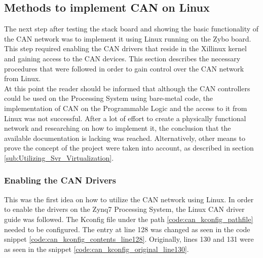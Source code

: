 \subsection{Methods to implement CAN on Linux}\label{sec:methods_to_implement_can}

The next step after testing the stack board and showing the basic functionality of the CAN network was to implement it using Linux running on the Zybo board.
This step required enabling the CAN drivers that reside in the Xillinux kernel and gaining access to the CAN devices.
This section describes the necessary procedures that were followed in order to gain control over the CAN network from Linux.
\\
At this point the reader should be informed that although the CAN controllers could be used on the Processing System using bare-metal code, the implementation of CAN on the Programmable Logic and the access to it from Linux was not successful.
After a lot of effort to create a physically functional network and researching on how to implement it, the conclusion that the available documentation is lacking was reached.
Alternatively, other means to prove the concept of the project were taken into account, as described in section \ref{sub:Utilizing_Svr_Virtualization}.

\subsubsection{Enabling the CAN Drivers}

This was the first idea on how to utilize the CAN network using Linux.
In order to enable the drivers on the Zynq7 Processing System, the Linux CAN driver guide \cite{Xilinx_wiki_Linux_CAN_driver} was followed.
The Kconfig file under the path \ref{code:can_kconfig_pathfile} needed to be configured.
The entry at line 128 was changed as seen in the code snippet \ref{code:can_kconfig_contents_line128}.
Originally, lines 130 and 131 were as seen in the snippet \ref{code:can_kconfig_original_line130}.

